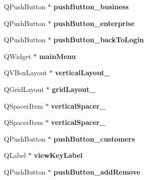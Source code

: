 \begin{DoxyCompactItemize}
\hypertarget{class_ui___main_window_a4c957ba501fdc47f04b020598d49db0f}{}\label{class_ui___main_window_a4c957ba501fdc47f04b020598d49db0f} 
Q\+Push\+Button $\ast$ {\bfseries push\+Button\+\_\+business}
\item 
\hypertarget{class_ui___main_window_a9f3deab9278cb121cb2a4857b12c84f6}{}\label{class_ui___main_window_a9f3deab9278cb121cb2a4857b12c84f6} 
Q\+Push\+Button $\ast$ {\bfseries push\+Button\+\_\+enterprise}
\item 
\hypertarget{class_ui___main_window_aa8715578a4a3dd71b3cf73132ac530b0}{}\label{class_ui___main_window_aa8715578a4a3dd71b3cf73132ac530b0} 
Q\+Push\+Button $\ast$ {\bfseries push\+Button\+\_\+back\+To\+Login}
\item 
\hypertarget{class_ui___main_window_aa90177c5f0bfd308f4a100e3b95c05f7}{}\label{class_ui___main_window_aa90177c5f0bfd308f4a100e3b95c05f7} 
Q\+Widget $\ast$ {\bfseries main\+Menu}
\item 
\hypertarget{class_ui___main_window_a6f40fc110b15410c00837a446d57bdbe}{}\label{class_ui___main_window_a6f40fc110b15410c00837a446d57bdbe} 
Q\+V\+Box\+Layout $\ast$ {\bfseries vertical\+Layout\+\_}
\item 
\hypertarget{class_ui___main_window_a8ee86315639f324b17708efc7dbe8b19}{}\label{class_ui___main_window_a8ee86315639f324b17708efc7dbe8b19} 
Q\+Grid\+Layout $\ast$ {\bfseries grid\+Layout\+\_}
\item 
\hypertarget{class_ui___main_window_a9d4bfb2fa0d87ccf9f7a311116676be6}{}\label{class_ui___main_window_a9d4bfb2fa0d87ccf9f7a311116676be6} 
Q\+Spacer\+Item $\ast$ {\bfseries vertical\+Spacer\+\_}
\item 
\hypertarget{class_ui___main_window_a2e4c63737c14e5af736837df590fe004}{}\label{class_ui___main_window_a2e4c63737c14e5af736837df590fe004} 
Q\+Spacer\+Item $\ast$ {\bfseries vertical\+Spacer\+\_}
\item 
\hypertarget{class_ui___main_window_a97a123cd6ffc3d9a9ebbc8c7ef871a2d}{}\label{class_ui___main_window_a97a123cd6ffc3d9a9ebbc8c7ef871a2d} 
Q\+Push\+Button $\ast$ {\bfseries push\+Button\+\_\+customers}
\item 
\hypertarget{class_ui___main_window_aca07cec23fa7d1236c8b9fe1ba9eaab1}{}\label{class_ui___main_window_aca07cec23fa7d1236c8b9fe1ba9eaab1} 
Q\+Label $\ast$ {\bfseries view\+Key\+Label}
\item 
\hypertarget{class_ui___main_window_a88478386a2833278e0565c3802fe40c3}{}\label{class_ui___main_window_a88478386a2833278e0565c3802fe40c3} 
Q\+Push\+Button $\ast$ {\bfseries push\+Button\+\_\+add\+Remove}

\end{DoxyCompactItemize}
